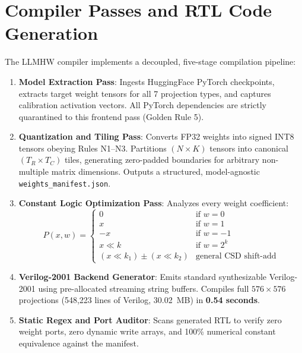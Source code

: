 \documentclass[11pt,a4paper]{article}
\begin{document}
\section{Compiler Passes and RTL Code Generation}

The LLMHW compiler implements a decoupled, five-stage compilation pipeline:
\begin{enumerate}
    \item \textbf{Model Extraction Pass}: Ingests HuggingFace PyTorch checkpoints, extracts target weight tensors for all 7 projection types, and captures calibration activation vectors. All PyTorch dependencies are strictly quarantined to this frontend pass (Golden Rule 5).
    \item \textbf{Quantization and Tiling Pass}: Converts FP32 weights into signed INT8 tensors obeying Rules N1--N3. Partitions $(N \times K)$ tensors into canonical $(T_R \times T_C)$ tiles, generating zero-padded boundaries for arbitrary non-multiple matrix dimensions. Outputs a structured, model-agnostic \texttt{weights\_manifest.json}.
    \item \textbf{Constant Logic Optimization Pass}: Analyzes every weight coefficient:
    \begin{equation}
    P(x, w) = \begin{cases}
    0 & \text{if } w = 0 \\
    x & \text{if } w = 1 \\
    -x & \text{if } w = -1 \\
    x \ll k & \text{if } w = 2^k \\
    (x \ll k_1) \pm (x \ll k_2) & \text{general CSD shift-add}
    \end{cases}
    \end{equation}
    \item \textbf{Verilog-2001 Backend Generator}: Emits standard synthesizable Verilog-2001 using pre-allocated streaming string buffers. Compiles full $576 \times 576$ projections (548,223 lines of Verilog, 30.02~MB) in \textbf{0.54 seconds}.
    \item \textbf{Static Regex and Port Auditor}: Scans generated RTL to verify zero weight ports, zero dynamic write arrays, and 100\% numerical constant equivalence against the manifest.
\end{enumerate}
\end{document}
